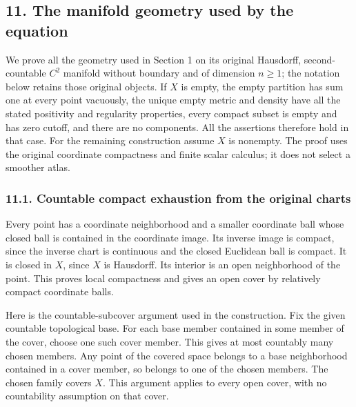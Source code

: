 \documentclass[
  11pt,
]{article}
\begin{document}
\subsection{11. The manifold geometry used by the
equation}\label{the-manifold-geometry-used-by-the-equation}

We prove all the geometry used in Section 1 on its original Hausdorff,
second-countable \(C^2\) manifold without boundary and of dimension
\(n\geq1\); the notation below retains those original objects. If \(X\)
is empty, the empty partition has sum one at every point vacuously, the
unique empty metric and density have all the stated positivity and
regularity properties, every compact subset is empty and has zero
cutoff, and there are no components. All the assertions therefore hold
in that case. For the remaining construction assume \(X\) is nonempty.
The proof uses the original coordinate compactness and finite scalar
calculus; it does not select a smoother atlas.

\subsubsection{11.1. Countable compact exhaustion from the original
charts}\label{countable-compact-exhaustion-from-the-original-charts}

Every point has a coordinate neighborhood and a smaller coordinate ball
whose closed ball is contained in the coordinate image. Its inverse
image is compact, since the inverse chart is continuous and the closed
Euclidean ball is compact. It is closed in \(X\), since \(X\) is
Hausdorff. Its interior is an open neighborhood of the point. This
proves local compactness and gives an open cover by relatively compact
coordinate balls.

Here is the countable-subcover argument used in the construction. Fix
the given countable topological base. For each base member contained in
some member of the cover, choose one such cover member. This gives at
most countably many chosen members. Any point of the covered space
belongs to a base neighborhood contained in a cover member, so belongs
to one of the chosen members. The chosen family covers \(X\). This
argument applies to every open cover, with no countability assumption on
that cover.
\end{document}
